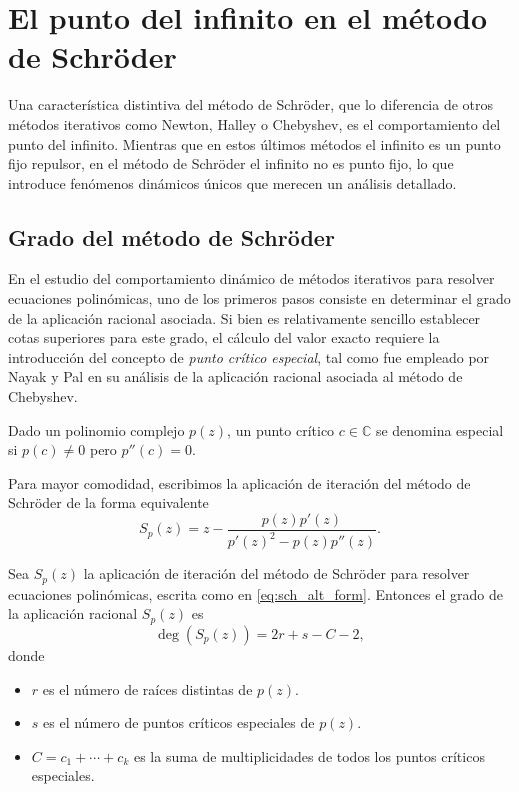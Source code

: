 \section{El punto del infinito en el método de Schröder}

Una característica distintiva del método de Schröder, que lo diferencia de otros métodos iterativos como Newton, Halley o Chebyshev, es el comportamiento del punto del infinito. Mientras que en estos últimos métodos el infinito es un punto fijo repulsor, en el método de Schröder el infinito no es punto fijo, lo que introduce fenómenos dinámicos únicos que merecen un análisis detallado.

\subsection{Grado del método de Schröder}

En el estudio del comportamiento dinámico de métodos iterativos para resolver ecuaciones polinómicas, uno de los primeros pasos consiste en determinar el grado de la aplicación racional asociada. Si bien es relativamente sencillo establecer cotas superiores para este grado, el cálculo del valor exacto requiere la introducción del concepto de \emph{punto crítico especial}, tal como fue empleado por Nayak y Pal en su análisis de la aplicación racional asociada al método de Chebyshev.

\begin{dfn}
Dado un polinomio complejo $p(z)$, un punto crítico $c\in\mathbb{C}$ se denomina especial si $p(c)\ne 0$ pero $p''(c) = 0$.
\end{dfn}

Para mayor comodidad, escribimos la aplicación de iteración del método de Schröder de la forma equivalente
\begin{equation}
S_p(z)=z -\frac{p(z)p'(z)}{p'(z)^2- p(z)p''(z)}.
\label{eq:sch_alt_form}
\end{equation}

\begin{teorema}\label{teo:grado_schroder}
Sea $S_p(z)$ la aplicación de iteración del método de Schröder para resolver ecuaciones polinómicas, escrita como en \eqref{eq:sch_alt_form}. Entonces el grado de la aplicación racional $S_{p}(z)$ es
$$\deg(S_{p}(z)) =2r+s-C-2,$$
donde
\begin{itemize}
\item $r$ es el número de raíces distintas de $p(z)$.
\item $s$ es el número de puntos críticos especiales de $p(z)$.
\item $C=c_1+\cdots+c_k$ es la suma de multiplicidades de todos los puntos críticos especiales.
\end{itemize}
\end{teorema}

